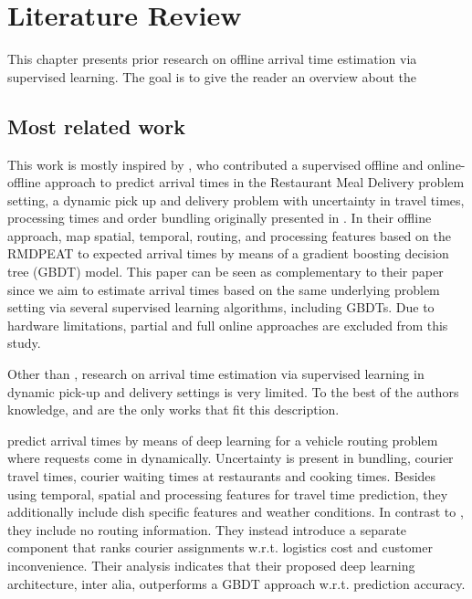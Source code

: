 \chapter{Literature Review}

This chapter presents prior research on offline arrival time estimation via supervised learning. The goal is to give the reader an overview about the   


\section{Most related work}
This work is mostly inspired by \cite{Hildebrandt2020_EAT}, who contributed a supervised offline and online-offline approach to predict arrival times in the Restaurant Meal Delivery problem setting, a dynamic pick up and delivery problem with uncertainty in travel times, processing times and order bundling originally  presented in \cite{UlmerRMDP}.
In their offline approach, \cite{Hildebrandt2020_EAT} map spatial, temporal, routing, and processing features based on the RMDPEAT to expected arrival times by means of a gradient boosting decision tree (GBDT) model. This paper can be seen as complementary to their paper since we aim to estimate arrival times based on the same underlying problem setting via several supervised learning algorithms, including GBDTs. Due to hardware limitations, partial and full online approaches are excluded from this study. 

Other than \cite{Hildebrandt2020_EAT}, research on arrival time estimation via supervised learning in dynamic pick-up and delivery settings is very limited. To the best of the authors knowledge, \cite{Zhu2020_OFCTE_DL} and \cite{Liu2018_LM_PLM} are the only works that fit this description. 

\cite{Zhu2020_OFCTE_DL} predict arrival times by means of deep learning for a vehicle routing problem where requests come in dynamically. Uncertainty is present in bundling, courier travel times, courier waiting times at restaurants and cooking times. Besides using temporal, spatial and processing features for travel time prediction, they additionally include dish specific features and weather conditions. In contrast to \cite{Hildebrandt2020_EAT}, they include no routing information. They instead introduce a separate component that ranks courier assignments w.r.t. logistics cost and customer inconvenience. Their analysis indicates that their proposed deep learning architecture, inter alia, outperforms a GBDT approach w.r.t. prediction accuracy.

